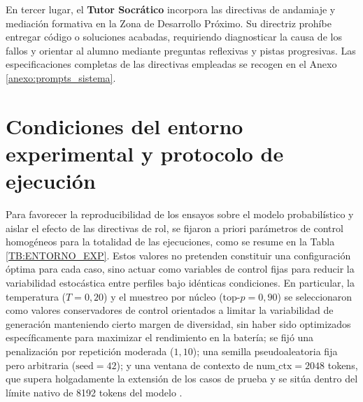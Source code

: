 En tercer lugar, el \textbf{Tutor Socrático} incorpora las directivas de andamiaje y mediación formativa en la Zona de Desarrollo Próximo. Su directriz prohíbe entregar código o soluciones acabadas, requiriendo diagnosticar la causa de los fallos y orientar al alumno mediante preguntas reflexivas y pistas progresivas. Las especificaciones completas de las directivas empleadas se recogen en el Anexo \ref{anexo:prompts_sistema}.

\section{Condiciones del entorno experimental y protocolo de ejecución}
\label{sec:condiciones_entorno}

Para favorecer la reproducibilidad de los ensayos sobre el modelo probabilístico y aislar el efecto de las directivas de rol, se fijaron a priori parámetros de control homogéneos para la totalidad de las ejecuciones, como se resume en la Tabla \ref{TB:ENTORNO_EXP}. Estos valores no pretenden constituir una configuración óptima para cada caso, sino actuar como variables de control fijas para reducir la variabilidad estocástica entre perfiles bajo idénticas condiciones. En particular, la temperatura ($T = 0{,}20$) y el muestreo por núcleo ($\text{top-}p = 0{,}90$) se seleccionaron como valores conservadores de control orientados a limitar la variabilidad de generación manteniendo cierto margen de diversidad, sin haber sido optimizados específicamente para maximizar el rendimiento en la batería; se fijó una penalización por repetición moderada ($1{,}10$); una semilla pseudoaleatoria fija pero arbitraria ($\text{seed} = 42$); y una ventana de contexto de $\text{num\_ctx} = 2048$ tokens, que supera holgadamente la extensión de los casos de prueba y se sitúa dentro del límite nativo de 8192 tokens del modelo \cite{dubey2024llama}.

